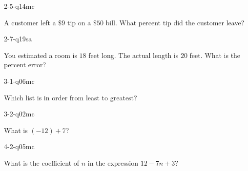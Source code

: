 \begin{practiceQuestion}{2-5-q14}{mc}
\begin{questionText}
A customer left a $\$9$ tip on a $\$50$ bill. What percent tip did the customer leave?


\end{questionText}
\end{practiceQuestion}

\begin{practiceQuestion}{2-7-q19}{sa}
\begin{questionText}
You estimated a room is $18$ feet long. The actual length is $20$ feet. What is the percent error?
\end{questionText}
\end{practiceQuestion}

\begin{practiceQuestion}{3-1-q06}{mc}
\begin{questionText}
Which list is in order from least to greatest?
\end{questionText}
\end{practiceQuestion}

\begin{practiceQuestion}{3-2-q02}{mc}
\begin{questionText}
What is $(-12) + 7$?
\end{questionText}
\end{practiceQuestion}

\begin{practiceQuestion}{4-2-q05}{mc}
\begin{questionText}
What is the coefficient of $n$ in the expression $12 - 7n + 3$?
\end{questionText}
\end{practiceQuestion}

